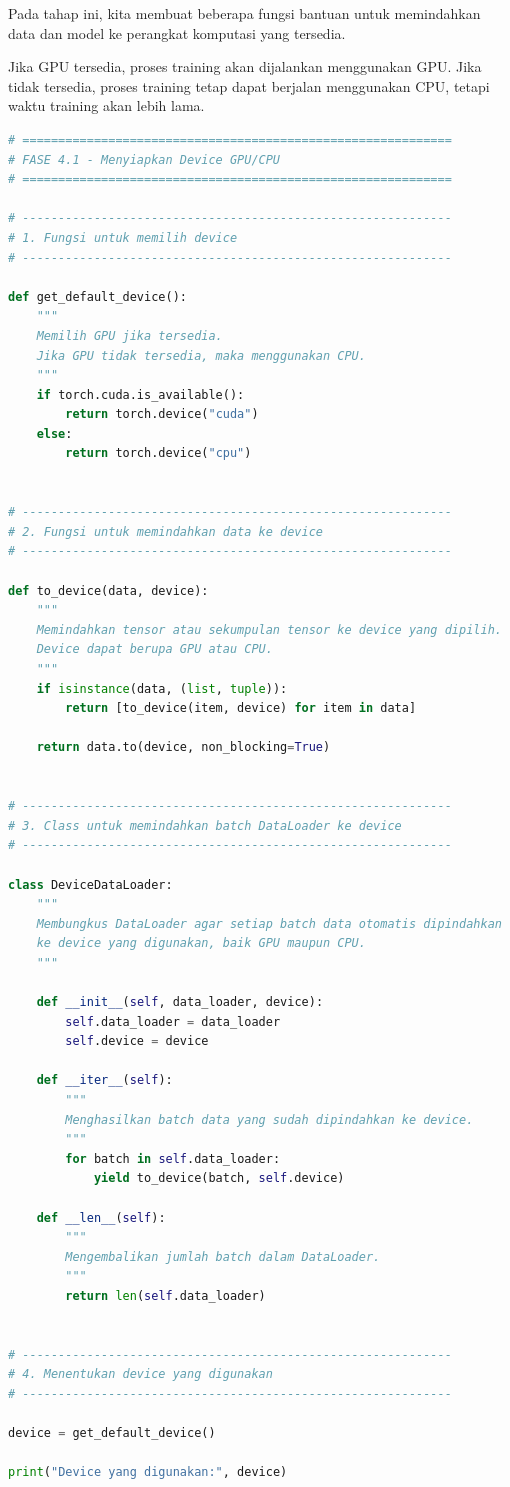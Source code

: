 Pada tahap ini, kita membuat beberapa fungsi bantuan untuk memindahkan data dan model ke perangkat komputasi yang tersedia.

Jika GPU tersedia, proses training akan dijalankan menggunakan GPU. Jika tidak tersedia, proses training tetap dapat berjalan menggunakan CPU, tetapi waktu training akan lebih lama.

\begin{lstlisting}[language=Python, caption=Fungsi untuk menyiapkan device GPU/CPU]
# ============================================================
# FASE 4.1 - Menyiapkan Device GPU/CPU
# ============================================================

# ------------------------------------------------------------
# 1. Fungsi untuk memilih device
# ------------------------------------------------------------

def get_default_device():
    """
    Memilih GPU jika tersedia.
    Jika GPU tidak tersedia, maka menggunakan CPU.
    """
    if torch.cuda.is_available():
        return torch.device("cuda")
    else:
        return torch.device("cpu")


# ------------------------------------------------------------
# 2. Fungsi untuk memindahkan data ke device
# ------------------------------------------------------------

def to_device(data, device):
    """
    Memindahkan tensor atau sekumpulan tensor ke device yang dipilih.
    Device dapat berupa GPU atau CPU.
    """
    if isinstance(data, (list, tuple)):
        return [to_device(item, device) for item in data]

    return data.to(device, non_blocking=True)


# ------------------------------------------------------------
# 3. Class untuk memindahkan batch DataLoader ke device
# ------------------------------------------------------------

class DeviceDataLoader:
    """
    Membungkus DataLoader agar setiap batch data otomatis dipindahkan
    ke device yang digunakan, baik GPU maupun CPU.
    """

    def __init__(self, data_loader, device):
        self.data_loader = data_loader
        self.device = device

    def __iter__(self):
        """
        Menghasilkan batch data yang sudah dipindahkan ke device.
        """
        for batch in self.data_loader:
            yield to_device(batch, self.device)

    def __len__(self):
        """
        Mengembalikan jumlah batch dalam DataLoader.
        """
        return len(self.data_loader)


# ------------------------------------------------------------
# 4. Menentukan device yang digunakan
# ------------------------------------------------------------

device = get_default_device()

print("Device yang digunakan:", device)
\end{lstlisting}


